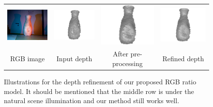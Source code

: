 \begin{figure}[!ht]
{\begin{tabular}{c|c c c}
   \includegraphics[height = 0.19\linewidth]{figures/methodology/ratio_vase_rgb.pdf}
   &
   \includegraphics[height = 0.19\linewidth]{figures/methodology/ratio_vase_shape_init.pdf} &
   \includegraphics[height = 0.19\linewidth]{figures/methodology/ratio_vase_shape_smooth.pdf} &
   \includegraphics[height = 0.19\linewidth]{figures/methodology/ratio_vase_shape.pdf} \\      {RGB image} & {Input depth} & {After pre-processing} &{Refined depth}                 
 \end{tabular}}
\caption{Illustrations for the depth refinement of our proposed RGB ratio model. It should be mentioned that the middle row is under the natural scene illumination and our method still works well.}
\label{fig:ratio_illustration}
\end{figure}



